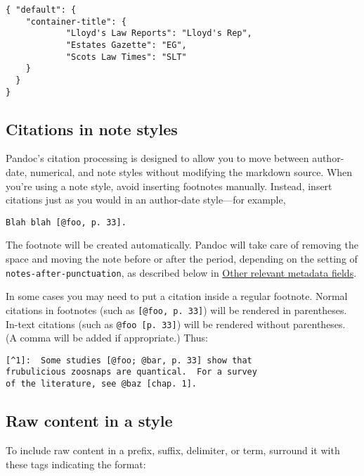 \begin{verbatim}
{ "default": {
    "container-title": {
            "Lloyd's Law Reports": "Lloyd's Rep",
            "Estates Gazette": "EG",
            "Scots Law Times": "SLT"
    }
  }
}
\end{verbatim}

\hypertarget{citations-in-note-styles}{%
\subsection{Citations in note styles}\label{citations-in-note-styles}}

Pandoc's citation processing is designed to allow you to move between
author-date, numerical, and note styles without modifying the markdown
source. When you're using a note style, avoid inserting footnotes
manually. Instead, insert citations just as you would in an author-date
style---for example,

\begin{verbatim}
Blah blah [@foo, p. 33].
\end{verbatim}

The footnote will be created automatically. Pandoc will take care of
removing the space and moving the note before or after the period,
depending on the setting of \texttt{notes-after-punctuation}, as
described below in
\protect\hyperlink{other-relevant-metadata-fields}{Other relevant
metadata fields}.

In some cases you may need to put a citation inside a regular footnote.
Normal citations in footnotes (such as \texttt{{[}@foo,\ p.\ 33{]}})
will be rendered in parentheses. In-text citations (such as
\texttt{@foo\ {[}p.\ 33{]}}) will be rendered without parentheses. (A
comma will be added if appropriate.) Thus:

\begin{verbatim}
[^1]:  Some studies [@foo; @bar, p. 33] show that
frubulicious zoosnaps are quantical.  For a survey
of the literature, see @baz [chap. 1].
\end{verbatim}

\hypertarget{raw-content-in-a-style}{%
\subsection{Raw content in a style}\label{raw-content-in-a-style}}

To include raw content in a prefix, suffix, delimiter, or term, surround
it with these tags indicating the format:

